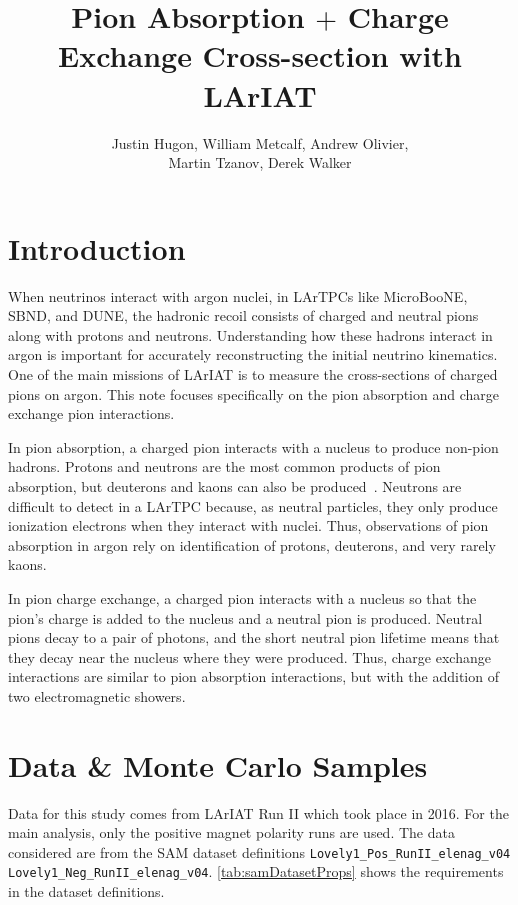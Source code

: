 \documentclass[letterpaper,12pt]{article}
\title{Pion Absorption $+$ Charge Exchange Cross-section with LArIAT}
\author{Justin Hugon, William Metcalf, Andrew Olivier,\\Martin Tzanov, Derek Walker}
\begin{document}
\maketitle

\section{Introduction}

When neutrinos interact with argon nuclei, in LArTPCs like MicroBooNE, SBND,
and DUNE, the hadronic recoil consists of charged and neutral pions along with
protons and neutrons. Understanding how these hadrons interact in argon is
important for accurately reconstructing the initial neutrino kinematics.  One
of the main missions of LArIAT is to measure the cross-sections of charged
pions on argon. This note focuses specifically on the pion absorption and
charge exchange pion interactions.

In pion absorption, a charged pion interacts with a nucleus to produce non-pion
hadrons. Protons and neutrons are the most common products of pion absorption,
but deuterons and kaons can also be
produced~\cite{Kotlinski:1998vh,Rowntree:1999dp,Kotlinski:2000hp,Androic:2001tq}.
Neutrons are difficult to detect in a LArTPC because, as neutral particles,
they only produce ionization electrons when they interact with nuclei. Thus,
observations of pion absorption in argon rely on identification of protons,
deuterons, and very rarely kaons.

In pion charge exchange, a charged pion interacts with a nucleus so that the
pion's charge is added to the nucleus and a neutral pion is produced. Neutral
pions decay to a pair of photons, and the short neutral pion lifetime means
that they decay near the nucleus where they were produced. Thus, charge
exchange interactions are similar to pion absorption interactions, but with the
addition of two electromagnetic showers.

\section{Data \& Monte Carlo Samples}

Data for this study comes from LArIAT Run II which took place in 2016. For the
main analysis, only the positive magnet polarity runs are used. The data
considered are from the SAM dataset definitions
\texttt{Lovely1\_Pos\_RunII\_elenag\_v04}
\texttt{Lovely1\_Neg\_RunII\_elenag\_v04}. \cref{tab:samDatasetProps} shows the
requirements in the dataset definitions.
\end{document}
